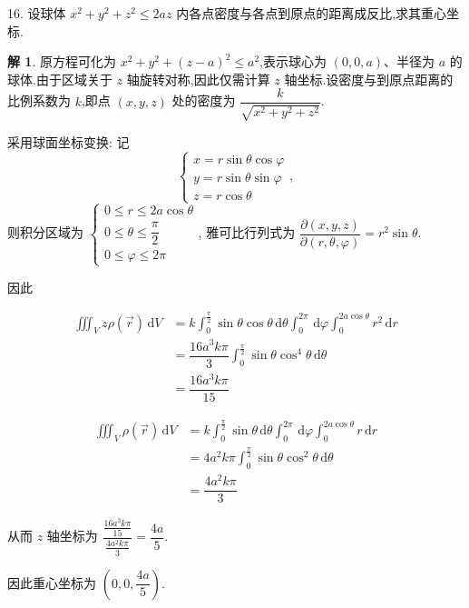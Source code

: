 \documentclass[a4paper,12pt]{article}
\theoremstyle{definition}
\newtheorem*{sol}{解}
\begin{document}
16. 设球体 $x^2 + y^2 + z^2 \leq 2az$ 内各点密度与各点到原点的距离成反比,求其重心坐标.
\begin{sol}
    原方程可化为 $x^2 + y^2 + (z-a)^2 \leq a^2$,表示球心为 $(0,0,a)$、半径为 $a$ 的球体.由于区域关于 $z$ 轴旋转对称,因此仅需计算 $z$ 轴坐标.设密度与到原点距离的比例系数为 $k$,即点 $(x,y,z)$ 处的密度为 $\dfrac{k}{\sqrt{x^2+y^2+z^2}}$.

    采用球面坐标变换: 记
    $$\begin{cases}
        x=r\sin\theta\cos\varphi \\
        y=r\sin\theta\sin\varphi \\
        z=r\cos\theta
    \end{cases},$$
    则积分区域为 $\begin{cases}
        0\leq r \leq 2a\cos\theta       \\
        0\leq \theta \leq \dfrac{\pi}{2} \\
        0\leq \varphi \leq 2\pi
    \end{cases}$, 雅可比行列式为 $\dfrac{\partial(x,y,z)}{\partial(r,\theta,\varphi)}=r^2\sin\theta$.

    因此

    \begin{align*}
        \iiint_V z\rho\left(\overrightarrow{r}\right)\,\mathrm{d}V
         & =k\int_0^{\frac{\pi}{2}}\sin\theta\cos\theta\,\mathrm{d}\theta\int_0^{2\pi}\,\mathrm{d}\varphi\int_0^{2a\cos\theta}r^2\,\mathrm{d}r \\
         & =\dfrac{16a^3k\pi}{3}\int_0^{\frac{\pi}{2}}\sin\theta\cos^4\theta\,\mathrm{d}\theta                                                  \\
         & =\dfrac{16a^3k\pi}{15}
    \end{align*}

    \begin{align*}
        \iiint_V \rho\left(\overrightarrow{r}\right)\,\mathrm{d}V
         & =k\int_0^{\frac{\pi}{2}}\sin\theta\,\mathrm{d}\theta\int_0^{2\pi}\,\mathrm{d}\varphi\int_0^{2a\cos\theta}r\,\mathrm{d}r \\
         & =4a^2k\pi\int_0^{\frac{\pi}{2}}\sin\theta\cos^2\theta\,\mathrm{d}\theta                                                 \\
         & =\dfrac{4a^2k\pi}{3}
    \end{align*}

    从而 $z$ 轴坐标为 $\dfrac{\frac{16a^3k\pi}{15}}{\frac{4a^2k\pi}{3}}=\dfrac{4a}{5}$.

    因此重心坐标为 $\left(0,0,\dfrac{4a}{5}\right)$.
\end{sol}
\end{document}

